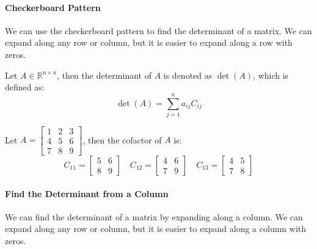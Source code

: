\documentclass[11pt]{article}
\begin{document}
\paragraph{Checkerboard Pattern} We can use the checkerboard pattern to find the determinant of a matrix. We can expand along any row or column, but it is easier to expand along a row with zeros.
\begin{definition}[Determinant]
    Let $A \in \mathbb{R}^{n \times n}$, then the determinant of $A$ is denoted as $\det(A)$, which is defined as:
    \begin{equation}
        \det(A) = \sum_{j=1}^{n} a_{ij}C_{ij}
    \end{equation}
\end{definition}
\begin{example}
    Let $A = \begin{bmatrix} 1 & 2 & 3 \\ 4 & 5 & 6 \\ 7 & 8 & 9 \end{bmatrix}$, then the cofactor of $A$ is:
    $$ C_{11} = \begin{bmatrix} 5 & 6 \\ 8 & 9 \end{bmatrix} \quad C_{12} = \begin{bmatrix} 4 & 6 \\ 7 & 9 \end{bmatrix} \quad C_{13} = \begin{bmatrix} 4 & 5 \\ 7 & 8 \end{bmatrix} $$
\end{example}
\paragraph{Find the Determinant from a Column} We can find the determinant of a matrix by expanding along a column. We can expand along any row or column, but it is easier to expand along a column with zeros.
\end{document}
